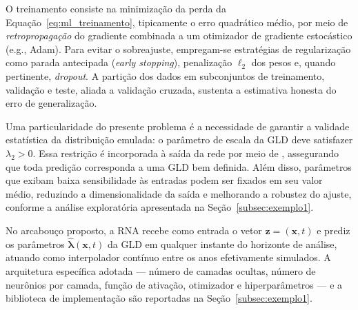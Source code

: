 O treinamento consiste na minimização da perda da Equação~\eqref{eq:ml_treinamento}, tipicamente o erro quadrático médio, por meio de \textit{retropropagação} do gradiente combinada a um otimizador de gradiente estocástico (e.g., Adam). Para evitar o sobreajuste, empregam-se estratégias de regularização como parada antecipada (\textit{early stopping}), penalização $\ell_2$ dos pesos e, quando pertinente, \textit{dropout}. A partição dos dados em subconjuntos de treinamento, validação e teste, aliada a validação cruzada, sustenta a estimativa honesta do erro de generalização.

Uma particularidade do presente problema é a necessidade de garantir a validade estatística da distribuição emulada: o parâmetro de escala da GLD deve satisfazer $\lambda_2 > 0$. Essa restrição é incorporada à saída da rede por meio de , assegurando que toda predição corresponda a uma GLD bem definida. Além disso, parâmetros que exibam baixa sensibilidade às entradas podem ser fixados em seu valor médio, reduzindo a dimensionalidade da saída e melhorando a robustez do ajuste, conforme a análise exploratória apresentada na Seção~\ref{subsec:exemplo1}.

No arcabouço proposto, a RNA recebe como entrada o vetor $\mathbf{z} = (\mathbf{x}, t)$ e prediz os parâmetros $\hat{\boldsymbol{\lambda}}(\mathbf{x},t)$ da GLD em qualquer instante do horizonte de análise, atuando como interpolador contínuo entre os anos efetivamente simulados. A arquitetura específica adotada --- número de camadas ocultas, número de neurônios por camada, função de ativação, otimizador e hiperparâmetros --- e a biblioteca de implementação são reportadas na Seção~\ref{subsec:exemplo1}. 
